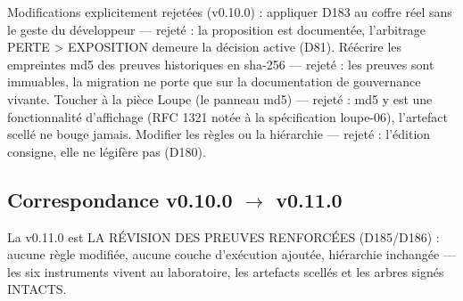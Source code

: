 Modifications explicitement rejetées (v0.10.0) : appliquer D183 au coffre
réel sans le geste du développeur — rejeté : la proposition est documentée,
l'arbitrage PERTE > EXPOSITION demeure la décision active (D81). Réécrire
les empreintes md5 des preuves historiques en sha-256 — rejeté : les
preuves sont immuables, la migration ne porte que sur la documentation de
gouvernance vivante. Toucher à la pièce Loupe (le panneau md5) — rejeté :
md5 y est une fonctionnalité d'affichage (RFC 1321 notée à la spécification
loupe-06), l'artefact scellé ne bouge jamais. Modifier les règles ou la
hiérarchie — rejeté : l'édition consigne, elle ne légifère pas (D180).

\subsection{Correspondance v0.10.0 $\to$ v0.11.0}\label{sec:evolutions110}

La v0.11.0 est LA RÉVISION DES PREUVES RENFORCÉES (D185/D186) : aucune
règle modifiée, aucune couche d'exécution ajoutée, hiérarchie inchangée —
les six instruments vivent au laboratoire, les artefacts scellés et les
arbres signés INTACTS.

